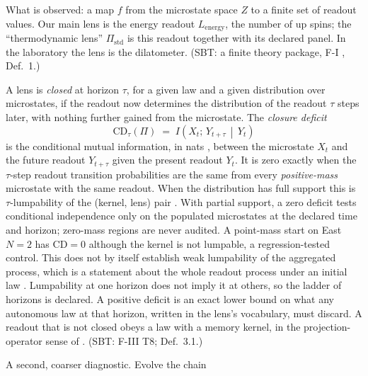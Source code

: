 \begin{description}[leftmargin=1.5em, itemsep=4pt]
  \item[Lens.] What is observed: a map $f$ from the microstate space $Z$ to a finite set of
    readout values. Our main lens is the energy readout $L_{\mathrm{energy}}$, the number of up
    spins; the ``thermodynamic lens'' $\Pi_{\mathrm{std}}$ is this readout together with its
    declared panel. In the laboratory the lens is the dilatometer. (SBT: a finite theory package,
    F-I , Def.~1.)
  \item[Closure and the closure deficit.] A lens is \emph{closed} at horizon $\tau$, for a given
    law and a given distribution over microstates, if the readout now determines the
    distribution of the readout $\tau$ steps later, with nothing further gained from the
    microstate. The \emph{closure deficit}
    \[
      \mathrm{CD}_{\tau}(\Pi) \;=\; I\!\left(X_t;\, Y_{t+\tau} \,\middle|\, Y_t\right)
    \]
    is the conditional mutual information, in nats \cite{cover-thomas-2006}, between the
    microstate $X_t$ and the future readout $Y_{t+\tau}$ given the present readout $Y_t$. It is
    zero exactly when the $\tau$-step readout transition probabilities are the same from every
    \emph{positive-mass} microstate with the same readout. When the distribution has
    full support this is $\tau$-lumpability of the (kernel, lens) pair
    \cite{burke-rosenblatt-1958,kemeny-snell-1960,buchholz-1994}. With partial
    support, a zero deficit tests conditional independence only on the populated microstates at
    the declared time and horizon; zero-mass regions are never audited. A point-mass start on East
    $N=2$ has $\mathrm{CD}=0$ although the kernel is not lumpable, a regression-tested control.
    This does not by itself establish weak lumpability of the aggregated process, which is a
    statement about the whole readout process under an initial law
    \cite{rubino-sericola-1989}. Lumpability at one
    horizon does not imply it at others, so the ladder of horizons is declared. A positive
    deficit is an exact lower bound on what any autonomous law at that horizon, written in the
    lens's vocabulary, must discard. A readout that is not closed obeys a law with a memory
    kernel, in the projection-operator sense of \cite{zwanzig-1961,mori-1965}. (SBT: F-III
     T8;  Def.~3.1.)
  \item[Packaging map and idempotence defect.] A second, coarser diagnostic. Evolve the chain

\end{description}

